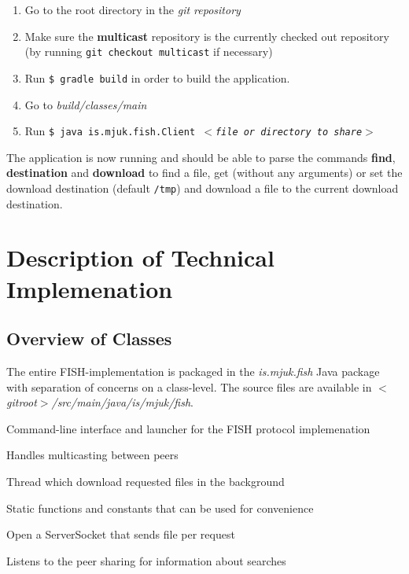 \documentclass[11pt]{article}
\begin{document}
\begin{enumerate}
    \item Go to the root directory in the \textit{git repository}
    \item Make sure the \textbf{multicast} repository is the currently checked
        out repository (by running \texttt{git checkout multicast} if necessary)
    \item Run \texttt{\$ gradle build} in order to build the application.
    \item Go to \textit{build/classes/main}
    \item Run \texttt{\$ java is.mjuk.fish.Client
        $<$\textit{file or directory to share}$>$}
\end{enumerate}

The application is now running and should be able to parse the commands
\textbf{find}, \textbf{destination} and \textbf{download} to find a file,
get (without any arguments) or set the download destination (default
\texttt{/tmp}) and download a file to the current download destination.

\section{Description of Technical Implemenation}

\subsection{Overview of Classes}

The entire FISH-implementation is packaged in the \textit{is.mjuk.fish} Java
package with separation of concerns on a class-level. The source files are
available in \textit{$<$gitroot$>$/src/main/java/is/mjuk/fish}.

\begin{description}[align=right,labelwidth=2cm]
    \item[Client] Command-line interface and launcher for the FISH protocol implemenation
    \item[DatagramHandler] Handles multicasting between peers
    \item[Downloader] Thread which download requested files in the background
    \item[Helpers] Static functions and constants that can be used for convenience
    \item[PeerListener] Open a ServerSocket that sends file per request
    \item[UnicastListener] Listens to the peer sharing for information about searches
\end{description}
\end{document}
